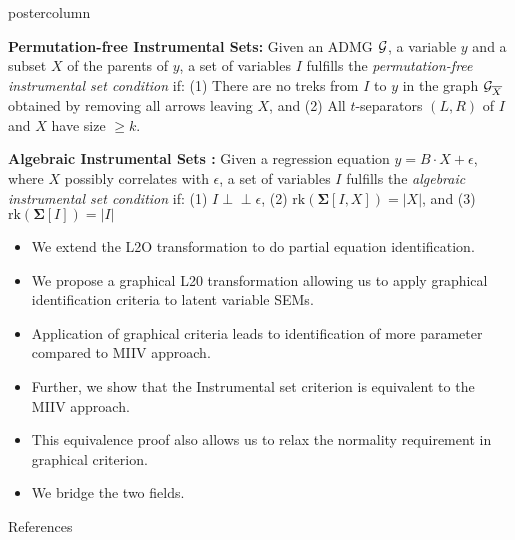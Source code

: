 \documentclass{beamer}
\def\ci{\perp\!\!\!\!\!\perp}
\begin{document}
\begin{frame}
\begin{columns}
\begin{column}{0.33\textwidth}
\begin{beamercolorbox}[center]{postercolumn}
\begin{minipage}{.98\textwidth}
{\begin{myblock}{}
		\textbf{Permutation-free Instrumental Sets:}
			Given an ADMG $\cal G$, a variable $y$ and a subset $X$ of the parents
			of $y$, a set of variables $I$ fulfills the \emph{permutation-free
			instrumental set condition} if: (1) There are no treks from $I$ to $y$
			in the graph ${\cal G}_{\overline{X}}$ obtained by removing all arrows
			leaving $X$, and (2) All $t$-separators $(L,R)$ of $I$ and $X$ have
			size $\geq k$.
		\vspace{1em}

		\textbf{Algebraic Instrumental Sets \citep{bollen2012instrumental}:}
			Given a regression equation $y = B \cdot X + \epsilon$, where $X$ possibly
			correlates with $\epsilon$, a set of variables
			$I$ fulfills the \emph{algebraic instrumental set condition} if: (1) $I \ci \epsilon$,
			(2) $\textrm{rk}(\bm{\Sigma}[I,X]) = |X|$, and (3) $\textrm{rk}(\bm{\Sigma}[I]) = |I|$
		
	\end{myblock}\vfill
	\begin{myblock}{}
		\begin{itemize}
			\item \justifying We extend the L2O transformation to do partial equation identification.
			\item \justifying We propose a graphical L20 transformation allowing us to apply graphical identification criteria to latent variable SEMs.
			\item \justifying Application of graphical criteria leads to identification of more parameter compared to MIIV approach.
			\item \justifying Further, we show that the Instrumental set criterion is equivalent to the MIIV approach.
			\item \justifying This equivalence proof also allows us to relax the normality requirement in graphical criterion.
			\item \justifying We bridge the two fields.
		\end{itemize}
	\end{myblock}\vfill
	\begin{myblock}{References}
		\footnotesize
		
		
	\end{myblock}\vfill
		}\end{minipage}\end{beamercolorbox}
	\end{column}
\end{columns}
\end{frame}
\end{document}
